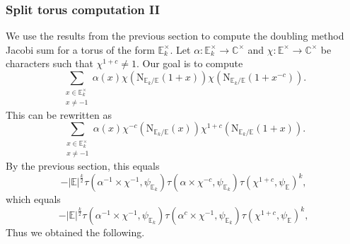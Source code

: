 \documentclass[12pt, reqno]{amsart}
\theoremstyle{definition}
\theoremstyle{definition}
\theoremstyle{definition}
\newcommand{\cComplex}{\mathbb{C}}
\newcommand{\multiplicativegroup}[1]{#1^{\times}}
\newcommand{\sizeof}[1]{\left|#1\right|}
\newcommand{\fieldCharacter}{\psi}
\newcommand{\involution}[1]{#1^{c}}
\newcommand{\minusInvolution}[1]{#1^{-c}}
\newcommand{\involutionPlusOne}[1]{#1^{1+c}}
\newcommand{\aFieldNorm}{\mathrm{N}}
\newcommand{\quadraticExtension}{\mathbb{E}}
\newcommand{\quadraticFieldExtension}[1]{\quadraticExtension_{#1}}
\newcommand{\GaussSumCharacter}[3]{\tau\left(#1 \times #2, #3\right)}
\begin{document}
\subsubsection{Split torus computation II}
We use the results from the previous section to compute the doubling method Jacobi sum for a torus of the form $\multiplicativegroup{\quadraticFieldExtension{k}}$. Let $\alpha \colon \multiplicativegroup{\quadraticFieldExtension{k}} \to \multiplicativegroup{\cComplex}$ and $\chi \colon \multiplicativegroup{\quadraticExtension} \to \multiplicativegroup{\cComplex}$ be characters such that $\involutionPlusOne{\chi} \ne 1$. Our goal is to compute $$\sum_{\substack{x \in \multiplicativegroup{\quadraticFieldExtension{k}}\\
		x \ne -1}} \alpha \left(x\right) \chi\left(\aFieldNorm_{\quadraticFieldExtension{k} \slash \quadraticExtension}\left(1 + x\right)\right) \chi\left(\aFieldNorm_{\quadraticFieldExtension{k} \slash \quadraticExtension}\left(1 + \minusInvolution{x}\right)\right).$$
This can be rewritten as
$$\sum_{\substack{x \in \multiplicativegroup{\quadraticFieldExtension{k}}\\
		x \ne -1}} \alpha \left(x\right) \minusInvolution{\chi}\left(\aFieldNorm_{\quadraticFieldExtension{k} \slash \quadraticExtension}\left(x\right)\right) \involutionPlusOne{\chi}\left(\aFieldNorm_{\quadraticFieldExtension{k} \slash \quadraticExtension}\left(1 + x\right)\right).$$
By the previous section, this equals
\begin{equation*}
	-\sizeof{\quadraticExtension}^{\frac{k}{2}} \GaussSumCharacter{\alpha^{-1}}{\chi^{-1}}{\fieldCharacter_{\quadraticFieldExtension{k}}} \GaussSumCharacter{\alpha}{\minusInvolution{\chi}}{\fieldCharacter_{\quadraticFieldExtension{k}}} \tau\left(\involutionPlusOne{\chi}, \fieldCharacter_{\quadraticExtension}\right)^k,
\end{equation*}
which equals
\begin{equation*}
	-\sizeof{\quadraticExtension}^{\frac{k}{2}} \GaussSumCharacter{\alpha^{-1}}{\chi^{-1}}{\fieldCharacter_{\quadraticFieldExtension{k}}} \GaussSumCharacter{\involution{\alpha}}{\chi^{-1}}{\fieldCharacter_{\quadraticFieldExtension{k}}} \tau\left(\involutionPlusOne{\chi}, \fieldCharacter_{\quadraticExtension}\right)^k,
\end{equation*}
Thus we obtained the following.
\end{document}
